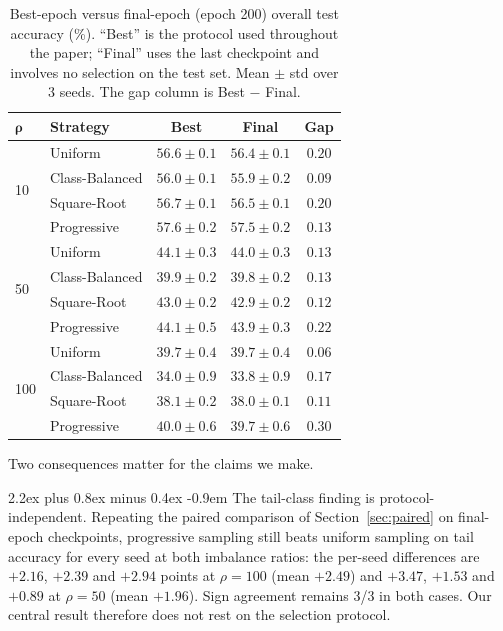 \documentclass[12pt,a4paper]{article}
\makeatletter
\renewcommand{\paragraph}{\@startsection{paragraph}{4}{\z@}%
  {2.2ex plus 0.8ex minus 0.4ex}%
  {-0.9em}%
  {\normalfont\normalsize\bfseries}}
\makeatother
\begin{document}
\begin{table}[H]
    \centering
    \caption{Best-epoch versus final-epoch (epoch 200) overall test accuracy (\%). ``Best'' is the protocol used throughout the paper; ``Final'' uses the last checkpoint and involves no selection on the test set. Mean $\pm$ std over 3 seeds. The gap column is Best $-$ Final.}
    \label{tab:best_vs_final}
    \begin{tabular}{llccc}
        \toprule
        $\boldsymbol{\rho}$ & \textbf{Strategy} & \textbf{Best} & \textbf{Final} & \textbf{Gap} \\
        \midrule
        \multirow{4}{*}{10}
        & Uniform        & $56.6 \pm 0.1$ & $56.4 \pm 0.1$ & $0.20$ \\
        & Class-Balanced & $56.0 \pm 0.1$ & $55.9 \pm 0.2$ & $0.09$ \\
        & Square-Root    & $56.7 \pm 0.1$ & $56.5 \pm 0.1$ & $0.20$ \\
        & Progressive    & $57.6 \pm 0.2$ & $57.5 \pm 0.2$ & $0.13$ \\
        \midrule
        \multirow{4}{*}{50}
        & Uniform        & $44.1 \pm 0.3$ & $44.0 \pm 0.3$ & $0.13$ \\
        & Class-Balanced & $39.9 \pm 0.2$ & $39.8 \pm 0.2$ & $0.13$ \\
        & Square-Root    & $43.0 \pm 0.2$ & $42.9 \pm 0.2$ & $0.12$ \\
        & Progressive    & $44.1 \pm 0.5$ & $43.9 \pm 0.3$ & $0.22$ \\
        \midrule
        \multirow{4}{*}{100}
        & Uniform        & $39.7 \pm 0.4$ & $39.7 \pm 0.4$ & $0.06$ \\
        & Class-Balanced & $34.0 \pm 0.9$ & $33.8 \pm 0.9$ & $0.17$ \\
        & Square-Root    & $38.1 \pm 0.2$ & $38.0 \pm 0.1$ & $0.11$ \\
        & Progressive    & $40.0 \pm 0.6$ & $39.7 \pm 0.6$ & $0.30$ \\
        \bottomrule
    \end{tabular}
\end{table}

Two consequences matter for the claims we make.

\paragraph{The tail-class finding is protocol-independent.} Repeating the paired comparison of Section~\ref{sec:paired} on final-epoch checkpoints, progressive sampling still beats uniform sampling on tail accuracy for every seed at both imbalance ratios: the per-seed differences are $+2.16$, $+2.39$ and $+2.94$ points at $\rho = 100$ (mean $+2.49$) and $+3.47$, $+1.53$ and $+0.89$ at $\rho = 50$ (mean $+1.96$). Sign agreement remains 3/3 in both cases. Our central result therefore does not rest on the selection protocol.
\end{document}
